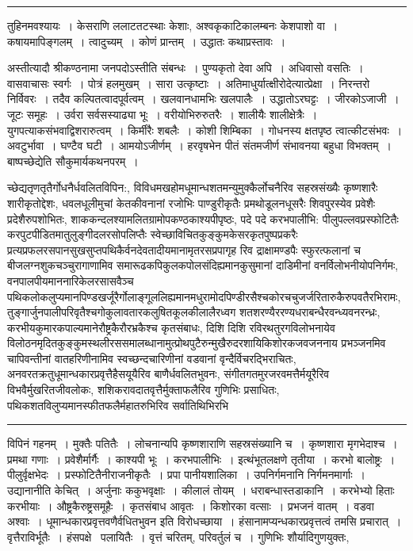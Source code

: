 \documentclass[11pt, openany]{book}
\begin{document}
\vspace{2mm}
\hrule

\noindent
{\s तुहिनमवश्यायः~। केसराणि ललाटतटस्थाः केशाः, अश्वकृकाटिकालम्बनः केशपाशो वा~। कषायमापिङ्गलम्~। त्वादुच्यम्~। कोणं प्रान्तम्~। उद्धातः कथाप्रस्तावः~।

अस्तीत्यादौ श्रीकण्ठनामा जनपदोऽस्तीति संबन्धः~। पुण्यकृतो देवा अपि~। अधिवासो वसतिः~। वासवाचासः स्वर्गः~। पोत्रं हलमुखम्~। सारा उत्कृष्टाः~। अतिमाधुर्यात्क्षीरोदेत्यात्प्रेक्षा~। निरन्तरो निर्विवरः~। तदैव कल्पितत्वादपूर्वत्वम्~। खलवानधामभिः खलपालैः~। उद्धातोऽरघट्टः~। जीरकोऽजाजी~। जूटः समूहः~। उर्वरा सर्वसस्याढ्या भूः~। वरीयोभिरुरुतरैः~। शालीयैः शालीक्षेत्रैः~। युगपत्याकसंभवाद्विशरारुत्वम्~। किर्मीरैः शबलैः~। कोशी शिम्बिका~। गोधनस्य क्षतपृष्ठ त्वात्कीटसंभवः~। अवटुर्भावा~। घण्टैव घटी~। आमयोऽजीर्णम्~। हरवृषभेन पीतं संतमजीर्ण संभावनया बहुधा विभक्तम्~। बाष्पच्छेद्येति सौकुमार्यकथनपरम्~।}

\newpage

\noindent
च्छेद्यतृणतृतैर्गोधनैर्धवलितविपिन:, विविधमखहोमधूमान्धशतमन्युमुक्कैर्लोचनैरिव सहस्रसंख्यैः कृष्णशारैः शारीकृतोद्देशः, धवलधूलीमुचां केतकीवनानां रजोभिः पाण्डुरीकृतैः प्रमथोडूलनधूसरैः शिवपुरस्येव प्रवेशैः प्रदेशैरुपशोभितः, शाककन्दलश्यामलितग्रामोपकण्ठकाश्यपीपृष्ठः, पदे पदे करभपालीभि: पीलुपल्लवप्रस्फोटितैः करपुटपीडितमातुलुङ्गीदलरसोपलिप्तैः स्वेच्छाविचितकुङ्कुमकेसरकृतपुष्पप्रकरैः प्रत्यप्रफलरसपानसुखसुप्तपथिकैर्वनदेवतादीयमानामृतरसप्रपागृह रिव द्राक्षामण्डपैः स्फुरत्फलानां च बीजलग्नशुकचञ्चुरागाणामिव समारूढकपिकुलकपोलसंदिह्यमानकुसुमानां दाडिमीनां वनर्विलोभनीयोपनिर्गमः, वनपालपीयमाननारिकेलरसासवैञ्च पथिकलोकलुप्यमानपिण्डखर्जूरैर्गोलाङ्गूललिह्यमानमधुरामोदपिण्डीरसैश्चकोरचचुजर्जरितारुकैरुपवतैरभिरामः, तुङ्गार्जुनपालीपरिवृतैश्चगोकुलावतारकलुषितकूलकीलालैरध्वग शतशरण्यैररण्यधराबन्धैरवन्ध्यवनरन्ध्रः, करभीयकुमारकपाल्यमानेरौष्ट्रकैरौरभ्रकैश्च कृतसंबाधः, दिशि दिशि रविरथतुरगविलोभनायेव विलोठनमृदितकुङ्कुमस्थलीरससमालब्धानामुत्प्रोथपुटैरुन्मुखैरुदरशायिकिशोरकजवजननाय प्रभञ्जनमिव चापिवन्तीनां वातहरिणीनामिव स्वच्छन्दचारिणीनां वडवानां वृन्दैर्विचरद्भिराचितः, अनवरतक्रतुधूमान्धकारप्रवृत्तैहैसयूयैरिव बाणैर्धवलितभुवनः, संगीतगतमुरजरवमत्तैर्मयूरैरिव विभवैर्मुखरितजीवलोकः, शशिकरावदातवृत्तैर्मुक्ताफलैरिव गुणिभिः प्रसाधितः, पथिकशतविलुप्यमानस्फीतफलैर्महातरुभिरिव सर्वातिथिभिरभि\textendash

\vspace{2mm}
\hrule

\noindent
{\s विपिनं गहनम्~। मुक्तैः पतितैः~। लोचनान्यपि कृष्णशाराणि सहस्रसंख्यानि च~। कृष्णशारा मृगभेदाश्च~। प्रमथा गणाः~। प्रवेशैर्मार्गैः~। काश्यपी भूः~। करभपालीभिः~। इत्थंभूतलक्षणे तृतीया~। करभो बालोष्ट्रः~। पीलुर्वृक्षभेदः~। प्रस्फोटितैनीराजनीकृतैः~। प्रपा पानीयशालिका~। उपनिर्गमनानि निर्गमनमार्गाः~। उद्यानानीति केचित्~। अर्जुनाः ककुभवृक्षाः~। कीलालं तोयम्~। धराबन्धास्तडाकानि~। करभेभ्यो हिताः करभीयाः~। औष्ट्रकैरुष्ट्रसमूहैः~। कृतसंबाध आवृतः~। किशोरका वत्साः~। प्रभजनं वातम्~। वडवा अश्वाः~। धूमान्धकारप्रवृत्तवणैर्वधितभुवन इति विरोधच्छाया~। हंसानामप्यन्धकारप्रवृत्तत्वं तमसि प्रचारात्~। वृत्तैराविर्भूतैः~। हंसपक्षे \textendash\ पलायितैः~। वृत्तं चरितम्, परिवर्तुलं च~। गुणिभिः शौर्यादिगुणयुक्तः,}
\end{document}

